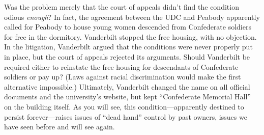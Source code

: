 Was the problem merely that the court of appeals didn't find the condition
odious \textit{enough}? In fact, the agreement between the UDC and Peabody
apparently called for Peabody to house young women descended from Confederate
soldiers for free in the dormitory.  Vanderbilt stopped the free housing, with
no objection.  In the litigation, Vanderbilt argued that the conditions were
never properly put in place, but the court of appeals rejected its arguments. 
Should Vanderbilt be required either to reinstate the free housing for
descendants of Confederate soldiers or pay up?  (Laws against racial
discrimination would make the first alternative impossible.)  Ultimately,
Vanderbilt changed the name on all official documents and the university's
website, but kept ``Confederate Memorial Hall'' on the building itself.  As you
will see, this condition---apparently destined to persist forever---raises
issues of ``dead hand'' control by past owners, issues we have seen before and
will see again.

